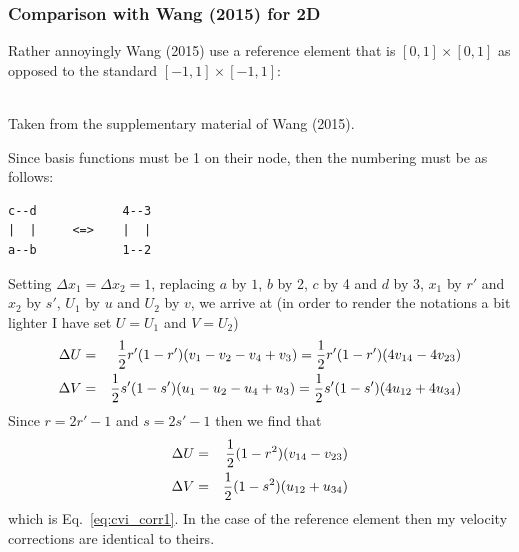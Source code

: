\subsubsection{Comparison with Wang \etal (2015) for 2D}

Rather annoyingly Wang \etal (2015) use a reference element that is $[0,1]\times[0,1]$
as opposed to the standard $[-1,1]\times[-1,1]$:
\begin{center}
\\
{\captionfont Taken from the supplementary material of Wang \etal (2015).}
\end{center}
Since basis functions must be 1 on their node, then the numbering must be as follows:
\begin{verbatim}
c--d            4--3
|  |     <=>    |  |
a--b            1--2
\end{verbatim}
Setting $\Delta x_1=\Delta x_2=1$, replacing $a$ by $1$, $b$ by 2, 
$c$ by 4 and $d$ by 3, $x_1$ by $r'$ and $x_2$ by $s'$, $U_1$ by $u$
and $U_2$ by $v$, we arrive at 
(in order to render the notations a bit lighter I have set $U=U_1$ and $V=U_2$)
\begin{eqnarray}
\Delta U &=& \frac12 r'(1-r')(v_1-v_2-v_4+v_3) = \frac12 r'(1-r')(4v_{14}-4v_{23}) \nonumber\\
\Delta V &=& \frac12 s'(1-s')(u_1-u_2-u_4+u_3) = \frac12 s'(1-s')(4u_{12}+4u_{34}) \nonumber
\end{eqnarray}
Since $r=2r'-1$ and $s=2s'-1$ then we find that 
\begin{eqnarray}
\Delta U &=& \frac12 (1-r^2)(v_{14}-v_{23}) \nonumber\\
\Delta V &=& \frac12 (1-s^2)(u_{12}+u_{34})
\end{eqnarray}
which is Eq.~\eqref{eq:cvi_corr1}. In the case of the reference element then 
my velocity corrections are identical to theirs.

